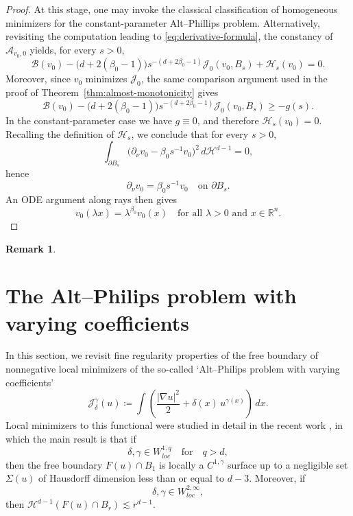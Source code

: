 \documentclass[reqno,11pt]{amsart}
\newtheorem{remark}{Remark}[section]
\newcommand{\1}{\mathds{1}}  %
\numberwithin{equation}{section}
\begin{document}
\begin{proof}
At this stage, one may invoke the classical classification of homogeneous minimizers for the constant-parameter Alt--Phillips problem. Alternatively, revisiting the computation leading to \eqref{eq:derivative-formula}, the constancy of $\mathcal{A}_{v_0,0}$ yields, for every $s>0$,
\[
    \mathcal{B}(v_0)
    -\bigl(d+2(\beta_0-1)\bigr)s^{-(d+2\beta_0-1)}\mathcal{J}_0(v_0,B_s)
    +\mathcal{H}_s(v_0)=0.
\]
Moreover, since $v_0$ minimizes $\mathcal{J}_0$, the same comparison argument used in the proof of
Theorem~\ref{thm:almost-monotonicity} gives
\[
    \mathcal{B}(v_0)
    -\bigl(d+2(\beta_0-1)\bigr)s^{-(d+2\beta_0-1)}\mathcal{J}_0(v_0,B_s)
    \ge -g(s).
\]
In the constant-parameter case we have $g\equiv 0$, and therefore $\mathcal{H}_s(v_0)=0$. Recalling the definition of $\mathcal{H}_s$, we conclude that for every $s>0$,
\[
    \int_{\partial B_s}\bigl(\partial_\nu v_0-\beta_0 s^{-1}v_0\bigr)^2\,d\mathcal{H}^{d-1}=0,
\]
hence
\[
    \partial_\nu v_0=\beta_0 s^{-1}v_0 \quad \text{on }\partial B_s.
\]
An ODE argument along rays then gives
\[
    v_0(\lambda x)=\lambda^{\beta_0}v_0(x)
\quad \text{for all }\lambda>0\text{ and }x\in\mathbb{R}^n.
\]
\end{proof}

\begin{remark}
    
\end{remark}

\section{The Alt--Philips problem with varying coefficients}\label{sct:Alt-philips-varying}

In this section, we revisit fine regularity properties of the free boundary of nonnegative local minimizers of the so-called `Alt--Philips problem with varying coefficients'
\begin{equation}\label{functional:alt_philips-varying}
	\mathcal{J}_\delta^\gamma(u) \coloneqq \int \left( \frac{|\nabla u|^2}{2} + \delta(x)\,u^{\gamma(x)} \right)\,dx.
\end{equation}
Local minimizers to this functional were studied in detail in the recent work \cite{ASTU1}, in which the main result is that if
\[
    \delta, \gamma \in W^{1,q}_{loc} \quad \text{for} \quad q>d,
\]
then the free boundary $F(u)\cap B_1$ is locally a $C^{1,\gamma}$ surface up to a negligible set $\Sigma(u)$ of Hausdorff dimension less than or equal to $d-3$. Moreover, if 
\[
    \delta, \gamma \in W^{2,\infty}_{loc},
\]
then $\mathcal{H}^{d-1}(F(u)\cap B_r) \lesssim r^{d-1}$.
\end{document}
